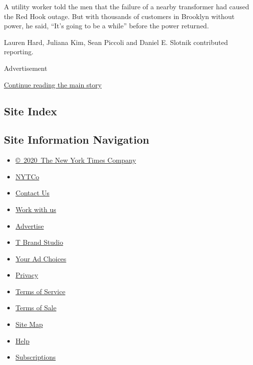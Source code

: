 A utility worker told the men that the failure of a nearby transformer
had caused the Red Hook outage. But with thousands of customers in
Brooklyn without power, he said, ``It's going to be a while'' before the
power returned.

Lauren Hard, Juliana Kim, Sean Piccoli and Daniel E. Slotnik contributed
reporting.

Advertisement

\protect\hyperlink{after-bottom}{Continue reading the main story}

\hypertarget{site-index}{%
\subsection{Site Index}\label{site-index}}

\hypertarget{site-information-navigation}{%
\subsection{Site Information
Navigation}\label{site-information-navigation}}

\begin{itemize}
\tightlist
\item
  \href{https://help.nytimes.com/hc/en-us/articles/115014792127-Copyright-notice}{©~2020~The
  New York Times Company}
\end{itemize}

\begin{itemize}
\tightlist
\item
  \href{https://www.nytco.com/}{NYTCo}
\item
  \href{https://help.nytimes.com/hc/en-us/articles/115015385887-Contact-Us}{Contact
  Us}
\item
  \href{https://www.nytco.com/careers/}{Work with us}
\item
  \href{https://nytmediakit.com/}{Advertise}
\item
  \href{http://www.tbrandstudio.com/}{T Brand Studio}
\item
  \href{https://www.nytimes.com/privacy/cookie-policy\#how-do-i-manage-trackers}{Your
  Ad Choices}
\item
  \href{https://www.nytimes.com/privacy}{Privacy}
\item
  \href{https://help.nytimes.com/hc/en-us/articles/115014893428-Terms-of-service}{Terms
  of Service}
\item
  \href{https://help.nytimes.com/hc/en-us/articles/115014893968-Terms-of-sale}{Terms
  of Sale}
\item
  \href{https://spiderbites.nytimes.com}{Site Map}
\item
  \href{https://help.nytimes.com/hc/en-us}{Help}
\item
  \href{https://www.nytimes.com/subscription?campaignId=37WXW}{Subscriptions}
\end{itemize}
